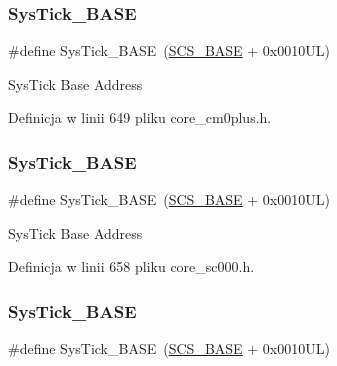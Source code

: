 \subsubsection{\texorpdfstring{Sys\+Tick\+\_\+\+B\+A\+SE}{SysTick\_BASE}\hspace{0.1cm}{\footnotesize\ttfamily [3/12]}}
{\footnotesize\ttfamily \#define Sys\+Tick\+\_\+\+B\+A\+SE~(\hyperlink{group___c_m_s_i_s__core__base_ga3c14ed93192c8d9143322bbf77ebf770}{S\+C\+S\+\_\+\+B\+A\+SE} +  0x0010\+U\+L)}

Sys\+Tick Base Address 

Definicja w linii 649 pliku core\+\_\+cm0plus.\+h.

\mbox{\label{group___c_m_s_i_s__core__base_ga58effaac0b93006b756d33209e814646}} 
\subsubsection{\texorpdfstring{Sys\+Tick\+\_\+\+B\+A\+SE}{SysTick\_BASE}\hspace{0.1cm}{\footnotesize\ttfamily [4/12]}}
{\footnotesize\ttfamily \#define Sys\+Tick\+\_\+\+B\+A\+SE~(\hyperlink{group___c_m_s_i_s__core__base_ga3c14ed93192c8d9143322bbf77ebf770}{S\+C\+S\+\_\+\+B\+A\+SE} +  0x0010\+U\+L)}

Sys\+Tick Base Address 

Definicja w linii 658 pliku core\+\_\+sc000.\+h.

\mbox{\label{group___c_m_s_i_s__core__base_ga58effaac0b93006b756d33209e814646}} 
\subsubsection{\texorpdfstring{Sys\+Tick\+\_\+\+B\+A\+SE}{SysTick\_BASE}\hspace{0.1cm}{\footnotesize\ttfamily [5/12]}}
{\footnotesize\ttfamily \#define Sys\+Tick\+\_\+\+B\+A\+SE~(\hyperlink{group___c_m_s_i_s__core__base_ga3c14ed93192c8d9143322bbf77ebf770}{S\+C\+S\+\_\+\+B\+A\+SE} +  0x0010\+U\+L)}

